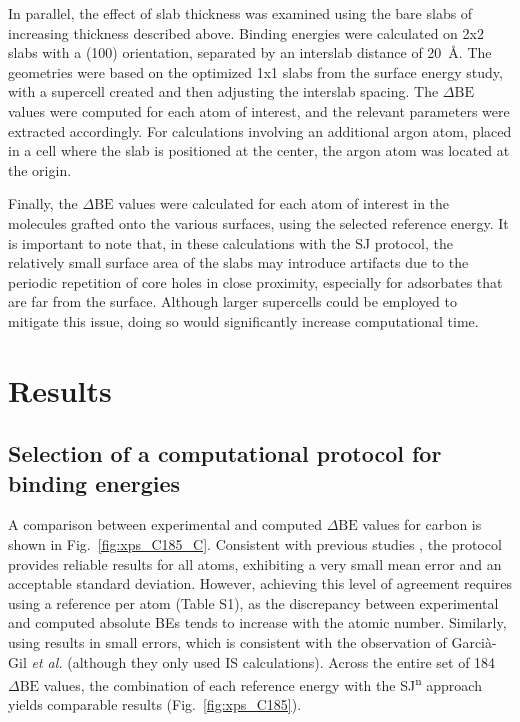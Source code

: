 \documentclass[journal=jpccck,manuscript=article]{achemso}
\def\dbe{\ensuremath{\Delta\text{BE}}}
\begin{document}
In parallel, the effect of slab thickness was examined using the bare slabs of increasing thickness described above. Binding energies were calculated on 2x2 slabs with a (100) orientation, separated by an interslab distance of \SI{20}{\angstrom}. The geometries were based on the optimized 1x1 slabs from the surface energy study, with a supercell created and then adjusting the interslab spacing. The \dbe{} values were computed for each atom of interest, and the relevant parameters were extracted accordingly. For calculations involving an additional argon atom, placed in a cell where the slab is positioned at the center, the argon atom was located at the origin.

Finally, the \dbe{} values were calculated for each atom of interest in the molecules grafted onto the various surfaces, using the selected reference energy. It is important to note that, in these calculations with the SJ protocol, the relatively small surface area of the slabs may introduce artifacts due to the periodic repetition of core holes in close proximity, especially for adsorbates that are far from the surface\cite{taucherFinalStateSimulationsCoreLevel2020}. Although larger supercells could be employed to mitigate this issue, doing so would significantly increase computational time.



\section{Results}\label{sec:results}


\subsection{Selection of a computational protocol for binding energies}\label{sec:proto}

A comparison between experimental and computed \dbe{} values for carbon is shown in Fig.~\ref{fig:xps_C185_C}. Consistent with previous studies \cite{pueyobellafontPredictingCoreLevel2017,golzeAccurateAbsoluteRelative2020}, the  protocol provides reliable results for all atoms, exhibiting a very small mean error and an acceptable standard deviation. However, achieving this level of agreement requires using a reference per atom (Table S1), as the discrepancy between experimental and computed absolute BEs tends to increase with the atomic number. Similarly, using  results in small errors, which is consistent with the observation of Garcià-Gil \textit{et al.}\cite{garcia-gilCalculationCoreLevel2012} (although they only used IS calculations). Across the entire set of 184 \dbe{} values, the combination of each reference energy with the SJ\textsuperscript{n} approach yields comparable results (Fig.~\ref{fig:xps_C185}). 
\end{document}
